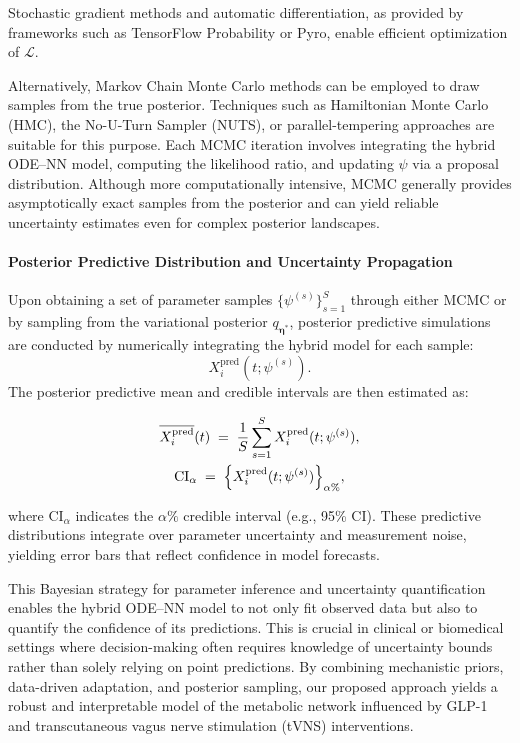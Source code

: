 \documentclass[9pt,shortpaper,twoside,web]{ieeecolor}
\begin{document}
Stochastic gradient methods and automatic differentiation, as provided by frameworks such as TensorFlow Probability or Pyro, enable efficient optimization of \(\mathcal{L}\).

Alternatively, Markov Chain Monte Carlo methods can be employed to draw samples from the true posterior. Techniques such as Hamiltonian Monte Carlo (HMC), the No-U-Turn Sampler (NUTS), or parallel-tempering approaches are suitable for this purpose. Each MCMC iteration involves integrating the hybrid ODE--NN model, computing the likelihood ratio, and updating \(\psi\) via a proposal distribution. Although more computationally intensive, MCMC generally provides asymptotically exact samples from the posterior and can yield reliable uncertainty estimates even for complex posterior landscapes.

\paragraph{Posterior Predictive Distribution and Uncertainty Propagation}

Upon obtaining a set of parameter samples \(\{\psi^{(s)}\}_{s=1}^S\) through either MCMC or by sampling from the variational posterior \(q_{\bm{\eta}^*}\), posterior predictive simulations are conducted by numerically integrating the hybrid model for each sample:
\[
X_i^{\text{pred}}(t; \psi^{(s)}).
\]
The posterior predictive mean and credible intervals are then estimated as:

\begin{equation}
\begin{gathered}
      \overline{X_i^{\text{pred}}}(t) \;=\; \frac{1}{S}\sum_{s=1}^S X_i^{\text{pred}}(t; \psi^{(s)}), \\
    \text{CI}_{\alpha} \;=\; \Bigl\{ X_i^{\text{pred}}(t; \psi^{(s)})\Bigr\}_{\alpha\%},  
\end{gathered}
\end{equation}

where \(\text{CI}_{\alpha}\) indicates the \(\alpha\%\) credible interval (e.g., 95\% CI). These predictive distributions integrate over parameter uncertainty and measurement noise, yielding error bars that reflect confidence in model forecasts.

This Bayesian strategy for parameter inference and uncertainty quantification enables the hybrid ODE--NN model to not only fit observed data but also to quantify the confidence of its predictions. This is crucial in clinical or biomedical settings where decision-making often requires knowledge of uncertainty bounds rather than solely relying on point predictions. By combining mechanistic priors, data-driven adaptation, and posterior sampling, our proposed approach yields a robust and interpretable model of the metabolic network influenced by GLP-1 and transcutaneous vagus nerve stimulation (tVNS) interventions.
\end{document}
